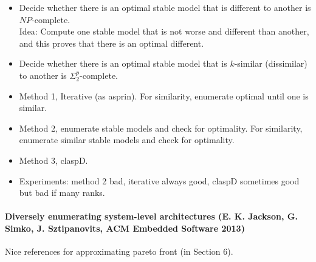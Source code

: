 \begin{itemize}
\item
    Decide whether there is an optimal stable model that is different to another is $NP$-complete.
    \\
    Idea: 
    Compute one stable model that is not worse and different than another, and this proves that there is an optimal different.
\item
    Decide whether there is an optimal stable model that is $k$-similar (dissimilar) to another is $\Sigma^p_2$-complete.
\item
    Method 1, Iterative (as asprin).
    For similarity, enumerate optimal until one is similar.
\item
    Method 2, enumerate stable models and check for optimality. 
    For similarity, enumerate similar stable models and check for optimality.
\item
    Method 3, claspD.
\item
    Experiments:
    method 2 bad, iterative always good, claspD sometimes good but bad if many ranks.
\end{itemize}



\newpage
\paragraph{Diversely enumerating system-level architectures (E. K. Jackson, G. Simko, J. Sztipanovits, ACM Embedded Software 2013)}
Nice references for approximating pareto front (in Section 6).






